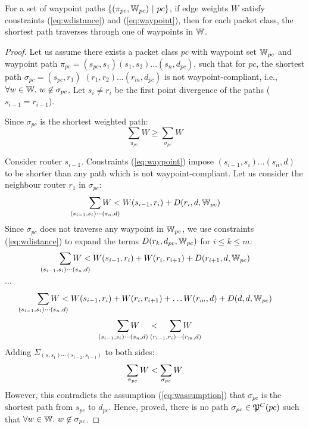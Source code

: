 \begin{theorem}[Correctness]
	For a set of waypoint paths $\{(\pi_{pc}, \mathbb{W}_{pc}) ~|~ pc\}$, if edge weights 
	$W$ satisfy constraints (\ref{eq:wdistance}) and (\ref{eq:waypoint}), then for
	each packet class, the shortest path 
	traverses through one of waypoints in $\mathbb{W}$.
\end{theorem}
\begin{proof}
	Let us assume there exists a packet class $pc$ with waypoint set $\mathbb{W}_{pc}$ 
	and waypoint path $\pi_{pc} = (s_{pc}, s_1)(s_1, s_2)\ldots (s_n, d_{pc})$, 
	such that for $pc$, the 
	shortest path $\sigma_{pc}=(s_{pc}, r_1)$ $(r_1, r_2)\ldots (r_m, d_{pc})$ 
	is not waypoint-compliant, i.e.,  
	$\forall w \in \mathbb{W}.~w \not\in \sigma_{pc}$. 
	Let $s_i \not= r_i$ be the first point divergence of the paths ($s_{i-1} = r_{i-1}$).
	
	
	Since $\sigma_{pc}$ is the shortest weighted path: 
	\begin{equation} \label{eq:wassumption}
	\sum_{\pi_{pc}} W \geq \sum_{\sigma_{pc}} W
	\end{equation}
	
Consider router $s_{i-1}$. 
Constraints (\ref{eq:waypoint}) impose 
$(s_{i-1}, s_i)\ldots(s_n, d)$ to be 
shorter than any path which is not waypoint-compliant. 
Let us consider the neighbour router $r_1$ in $\sigma_{pc}$:
	\[
	\sum_{\mathclap{\substack{(s_{i-1}, s_i)\cdots(s_n, d)}}} 
	W < W(s_{i-1}, r_i)+ D(r_i, d, \waypt_{pc})
	\]
	Since $\sigma_{pc}$ does not traverse any waypoint in $\mathbb{W}_{pc}$,
	we use constraints (\ref{eq:wdistance}) 
	to expand the terms $D(r_k, d_{pc}, \mathbb{W}_{pc})$ for $i \leq k \leq m$:
	\[
	\sum_{\mathclap{\substack{(s_{i-1}, s_i)\cdots(s_n, d)}}} 
	W < W(s_{i-1}, r_i)+ W(r_i, r_{i+1}) + D(r_{i+1}, d,\waypt_{pc})
	\] 
	\begin{center}
		$\ldots$
	\end{center}
	\[
	\sum_{\mathclap{\substack{(s_{i-1}, s_i)\cdots(s_n, d)}}} 
	W < W(s_{i-1}, r_i)+ W(r_i, r_{i+1}) + \ldots W(r_{m}, d) + D(d, d, \waypt_{pc})
	\] 
	\[
	\sum_{\mathclap{\substack{(s_{i-1}, s_i)\cdots(s_n, d)}}} 
	W \hspace{0.4cm}< \hspace{0.4cm}
	\sum_{\mathclap{\substack{(r_{i-1}, r_i)\cdots(r_m, d)}}} 
	W
	\]
	Adding $\Sigma_{(s, s_1)\cdots(s_{i-2},s_{i-1})}$ to both sides:
	\[
	\sum_{\mathclap{\substack{\pi_{pc}}}} 
	W < 
	\sum_{\mathclap{\substack{\sigma_{pc}}}} 
	W
	\] 
However, this contradicts the assumption (\ref{eq:wassumption}) that 
$\sigma_{pc}$ is the shortest path from $s_{pc}$ to $d_{pc}$. Hence, proved, there is no path $\sigma_{pc} \in \mathfrak{P}^C(pc)$ such that $\forall w \in \mathbb{W}.~
w \not\in \sigma_{pc}$. 
\end{proof}

